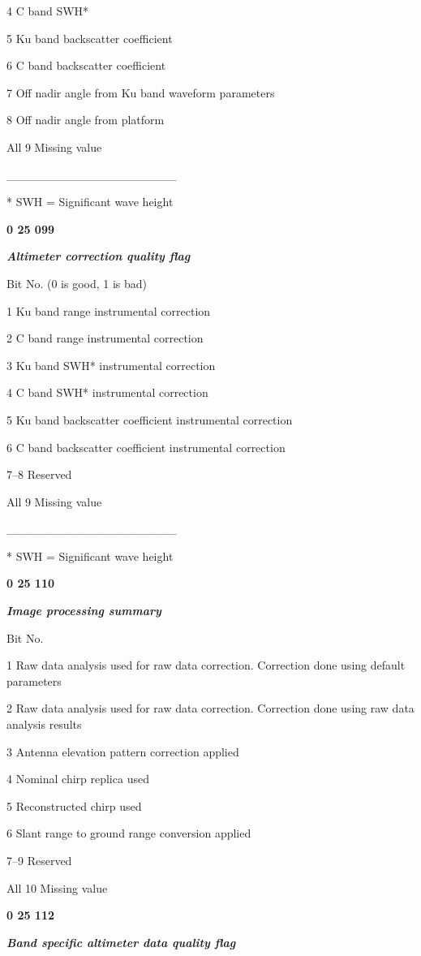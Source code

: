 4 C band SWH*

5 Ku band backscatter coefficient

6 C band backscatter coefficient

7 Off nadir angle from Ku band waveform parameters

8 Off nadir angle from platform

All 9 Missing value

\_\_\_\_\_\_\_\_\_\_\_\_\_\_\_\_\_\_\_\_

* SWH = Significant wave height

\textbf{0 25 099}

\emph{\textbf{Altimeter correction quality flag}}

Bit No. (0 is good, 1 is bad)

1 Ku band range instrumental correction

2 C band range instrumental correction

3 Ku band SWH* instrumental correction

4 C band SWH* instrumental correction

5 Ku band backscatter coefficient instrumental correction

6 C band backscatter coefficient instrumental correction

7--8 Reserved

All 9 Missing value

\_\_\_\_\_\_\_\_\_\_\_\_\_\_\_\_\_\_\_\_

* SWH = Significant wave height

\textbf{0 25 110}

\emph{\textbf{Image processing summary}}

Bit No.

1 Raw data analysis used for raw data correction. Correction done using default parameters

2 Raw data analysis used for raw data correction. Correction done using raw data analysis results

3 Antenna elevation pattern correction applied

4 Nominal chirp replica used

5 Reconstructed chirp used

6 Slant range to ground range conversion applied

7--9 Reserved

All 10 Missing value

\textbf{0 25 112}

\emph{\textbf{Band specific altimeter data quality flag}}


